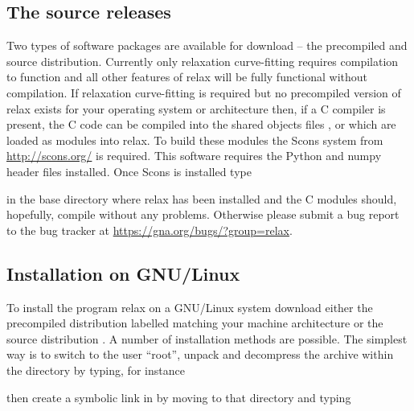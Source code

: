 \subsection{The source releases}
\label{sect: source releases}

Two types of software packages are available for download -- the precompiled and source distribution.  Currently only relaxation curve-fitting requires compilation to function and all other features of relax will be fully functional without compilation.  If relaxation curve-fitting is required but no precompiled version of relax exists for your operating system or architecture then, if a C compiler is present, the C code can be compiled into the shared objects files ,  or  which are loaded as modules into relax.  To build these modules the Scons system from \href{http://scons.org/}{http://scons.org/} is required.  This software requires the Python and numpy header files installed.  Once Scons is installed type


in the base directory where relax has been installed and the C modules should, hopefully, compile without any problems.  Otherwise please submit a bug report to the bug tracker at \href{https://gna.org/bugs/?group=relax}{https://gna.org/bugs/?group=relax}.



\subsection{Installation on GNU/Linux}

To install the program relax on a GNU/Linux system download either the precompiled distribution labelled  matching your machine architecture or the source distribution .  A number of installation methods are possible.  The simplest way is to switch to the user ``root'', unpack and decompress the archive within the  directory by typing, for instance


then create a symbolic link in  by moving to that directory and typing

